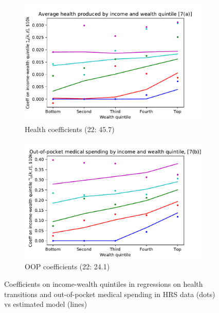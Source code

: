 \documentclass[12pt,pdftex,letterpaper]{article}
\begin{document}
\begin{figure}[h!]
    \centering
    \begin{subfigure}[b]{0.49\textwidth}
        \centering
        \includegraphics[width=\textwidth]{../Figures/HealthCoeffByIncWealth.pdf}
        \caption{Health coefficients (22: 45.7)}
    \end{subfigure}
    \begin{subfigure}[b]{0.49\textwidth}
        \centering
        \includegraphics[width=\textwidth]{../Figures/OOPcoeffByIncWealth.pdf}
        \caption{OOP coefficients (22: 24.1)}
    \end{subfigure}
    \caption{Coefficients on income-wealth quintiles in regressions on health transitions and out-of-pocket medical spending in HRS data (dots) vs estimated model (lines)}
    \label{fig:MomentCat7}
\end{figure}
\end{document}
